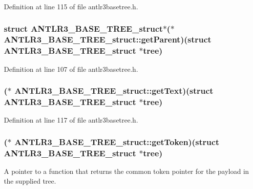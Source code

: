 Definition at line 115 of file antlr3basetree.\-h.

\hypertarget{struct_a_n_t_l_r3___b_a_s_e___t_r_e_e__struct_a72360ea28103f0bc166fedef0637647e}{
\subsubsection[{get\-Parent}]{\setlength{\rightskip}{0pt plus 5cm}struct {\bf A\-N\-T\-L\-R3\-\_\-\-B\-A\-S\-E\-\_\-\-T\-R\-E\-E\-\_\-struct}$\ast$($\ast$ A\-N\-T\-L\-R3\-\_\-\-B\-A\-S\-E\-\_\-\-T\-R\-E\-E\-\_\-struct\-::get\-Parent)(struct {\bf A\-N\-T\-L\-R3\-\_\-\-B\-A\-S\-E\-\_\-\-T\-R\-E\-E\-\_\-struct} $\ast$tree)}}\label{struct_a_n_t_l_r3___b_a_s_e___t_r_e_e__struct_a72360ea28103f0bc166fedef0637647e}


Definition at line 107 of file antlr3basetree.\-h.

\hypertarget{struct_a_n_t_l_r3___b_a_s_e___t_r_e_e__struct_a7ef255261f0dfda0d26ad8fa73bd9c2b}{
\subsubsection[{get\-Text}]{($\ast$ A\-N\-T\-L\-R3\-\_\-\-B\-A\-S\-E\-\_\-\-T\-R\-E\-E\-\_\-struct\-::get\-Text)(struct {\bf A\-N\-T\-L\-R3\-\_\-\-B\-A\-S\-E\-\_\-\-T\-R\-E\-E\-\_\-struct} $\ast$tree)}}\label{struct_a_n_t_l_r3___b_a_s_e___t_r_e_e__struct_a7ef255261f0dfda0d26ad8fa73bd9c2b}


Definition at line 117 of file antlr3basetree.\-h.

\hypertarget{struct_a_n_t_l_r3___b_a_s_e___t_r_e_e__struct_a63c1394d11e3a69a3be1c33f2b17df31}{
\subsubsection[{get\-Token}]{($\ast$ A\-N\-T\-L\-R3\-\_\-\-B\-A\-S\-E\-\_\-\-T\-R\-E\-E\-\_\-struct\-::get\-Token)(struct {\bf A\-N\-T\-L\-R3\-\_\-\-B\-A\-S\-E\-\_\-\-T\-R\-E\-E\-\_\-struct} $\ast$tree)}}\label{struct_a_n_t_l_r3___b_a_s_e___t_r_e_e__struct_a63c1394d11e3a69a3be1c33f2b17df31}
A pointer to a function that returns the common token pointer for the payload in the supplied tree. 

